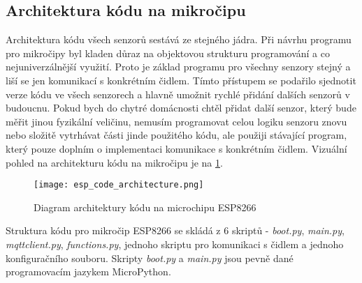 \subsection*{Architektura kódu na mikročipu}
Architektura kódu všech senzorů sestává ze stejného jádra. Při návrhu programu pro mikročipy byl kladen důraz na objektovou strukturu programování a co nejuniverzálnější využití. Proto je základ programu pro všechny senzory stejný a liší se jen komunikací s konkrétním čidlem. Tímto přístupem se podařilo sjednotit verze kódu ve všech senzorech a hlavně umožnit rychlé přidání dalších senzorů v budoucnu. Pokud bych do chytré domácnosti chtěl přidat další senzor, který bude měřit jinou fyzikální veličinu, nemusím programovat celou logiku senzoru znovu nebo složitě vytrhávat části jinde použitého kódu, ale použiji stávající program, který pouze doplním o implementaci komunikace s konkrétním čidlem. Vizuální pohled na architekturu kódu na mikročipu je na \cref{fig:esp_code_architecture}. 

\begin{figure}[H]
  \centering
  \texttt{[image: esp\_code\_architecture.png]}
  \caption{Diagram architektury kódu na microchipu ESP8266}
  \label{fig:esp_code_architecture}
\end{figure}

Struktura kódu pro mikročip ESP8266 se skládá z 6 skriptů - \textit{boot.py}, \textit{main.py}, \textit{mqttclient.py}, \textit{functions.py}, jednoho skriptu pro komunikaci s čidlem a jednoho konfiguračního souboru. Skripty \textit{boot.py} a \textit{main.py} jsou pevně dané programovacím jazykem MicroPython. 
 
